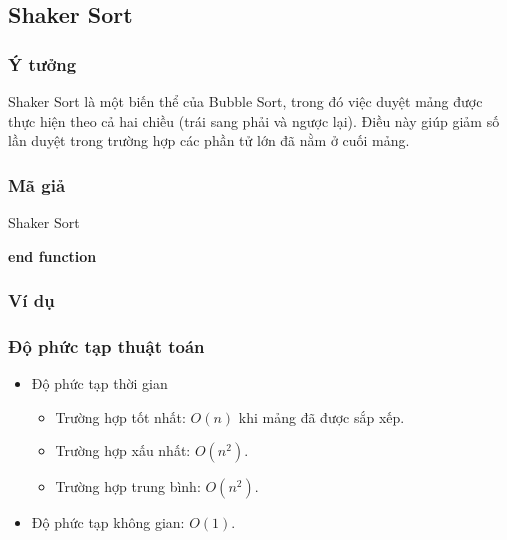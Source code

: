 \subsection{Shaker Sort}

\subsubsection{Ý tưởng}

Shaker Sort là một biến thể của Bubble Sort, trong đó việc duyệt mảng được thực hiện theo cả hai chiều (trái sang phải và ngược lại). Điều này giúp giảm số lần duyệt trong trường hợp các phần tử lớn đã nằm ở cuối mảng.

\subsubsection{Mã giả}

\begin{algorithm}[H]
	\caption{Shaker Sort}
	\label{shaker-sort}
	
	\textbf{end function}
\end{algorithm}

\subsubsection{Ví dụ}

\subsubsection{Độ phức tạp thuật toán}

\begin{itemize}
	\item Độ phức tạp thời gian
	\begin{itemize}[label=$\circ$]
		\item Trường hợp tốt nhất: $O(n)$ khi mảng đã được sắp xếp.
		\item Trường hợp xấu nhất: $O(n^2)$.
		\item Trường hợp trung bình: $O(n^2)$. 
	\end{itemize}
	
	\item Độ phức tạp không gian: $O(1)$.
\end{itemize}

